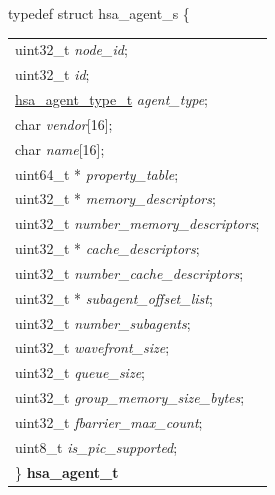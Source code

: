 \documentclass[final]{book}
\newcommand{\reffld}[1]{\textit{#1}}
\begin{document}
\begin{appendices}
\noindent\begin{tcolorbox}[breakable,nobeforeafter,arc=0mm,colframe=white,colback=lightgray,left=0mm]
typedef struct  hsa_agent_s \{
\vspace{-3.5mm}\begin{longtable}{@{}p{\textwidth}}
\hspace{1.7em}uint32_t \reffld{node_id};\\
\hspace{1.7em}uint32_t \reffld{id};\\
\hspace{1.7em}\hyperlink{group--topology-1ga2e7880ed1215a49400af0a0039771876}{hsa_agent_type_t} \reffld{agent_type};\\
\hspace{1.7em}char \reffld{vendor}[16];\\
\hspace{1.7em}char \reffld{name}[16];\\
\hspace{1.7em}uint64_t * \reffld{property_table};\\
\hspace{1.7em}uint32_t * \reffld{memory_descriptors};\\
\hspace{1.7em}uint32_t \reffld{number_memory_descriptors};\\
\hspace{1.7em}uint32_t * \reffld{cache_descriptors};\\
\hspace{1.7em}uint32_t \reffld{number_cache_descriptors};\\
\hspace{1.7em}uint32_t * \reffld{subagent_offset_list};\\
\hspace{1.7em}uint32_t \reffld{number_subagents};\\
\hspace{1.7em}uint32_t \reffld{wavefront_size};\\
\hspace{1.7em}uint32_t \reffld{queue_size};\\
\hspace{1.7em}uint32_t \reffld{group_memory_size_bytes};\\
\hspace{1.7em}uint32_t \reffld{fbarrier_max_count};\\
\hspace{1.7em}uint8_t \reffld{is_pic_supported};\\
\}  \hypertarget{group--topology-1gab8db3fb886332a24acac08ec361e1d86}{\textbf{hsa_agent_t}}
\end{longtable}


\end{tcolorbox}
\end{appendices}
\end{document}
